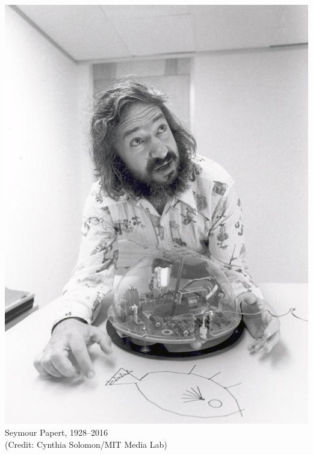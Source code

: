 \documentclass[table, 14pt, aspectratio=169]{beamer}
\newcommand{\hl}[1]{\textcolor{OxfordBlue}{\textbf{#1}}}
\begin{document}
\begin{frame}
  \begin{columns}[T]
    \begin{column}{0.4\textwidth}
      \includegraphics[height=0.8\textheight]{images/papert.jpeg}\\
      \tiny Seymour Papert, 1928--2016\\(Credit: Cynthia Solomon/MIT Media Lab)
    \end{column}    
  \end{columns}
\end{frame}
\end{document}
